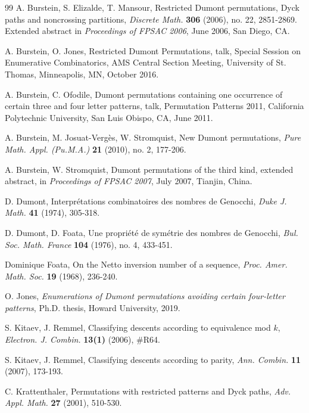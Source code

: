 \documentclass[
final
]{dmtcs-episciences}
\theoremstyle{definition}
\theoremstyle{remark}
\begin{document}
{\begin{thebibliography}{99}
 A. Burstein, S. Elizalde, T. Mansour, Restricted Dumont permutations, Dyck paths and noncrossing partitions, \emph{Discrete Math.} \textbf{306} (2006), no. 22, 2851-2869. Extended abstract in \emph{Proceedings of FPSAC 2006}, June 2006, San Diego, CA.

 A. Burstein, O. Jones, Restricted Dumont Permutations, talk, Special Session on Enumerative Combinatorics, AMS Central Section Meeting, University of St. Thomas, Minneapolis, MN, October 2016.

 A. Burstein, C. Ofodile, Dumont permutations containing one occurrence of certain three and four letter patterns, talk, Permutation Patterns 2011, California Polytechnic University, San Luis Obispo, CA, June 2011.

 A. Burstein, M. Josuat-Verg\`es, W. Stromquist, New Dumont permutations, \emph{Pure Math. Appl. (Pu.M.A.)} \textbf{21} (2010), no. 2, 177-206.

 A. Burstein, W. Stromquist, Dumont permutations of the third kind, extended abstract, in \emph{Proceedings of FPSAC 2007}, July 2007, Tianjin, China.

 D. Dumont, Interpr\'etations combinatoires des nombres de Genocchi, \emph{Duke J. Math.} \textbf {41} (1974), 305-318.

 D. Dumont, D. Foata, Une propri\'et\'e de sym\'etrie des nombres de Genocchi, \emph{Bul. Soc. Math. France} \textbf{104} (1976), no. 4, 433-451.

 Dominique Foata, On the Netto inversion number of a sequence, \emph{Proc. Amer. Math. Soc.} \textbf {19} (1968), 236-240.


 O. Jones, \emph{Enumerations of Dumont permutations avoiding certain four-letter patterns}, Ph.D. thesis, Howard University, 2019.

 S. Kitaev, J. Remmel, Classifying descents according to equivalence mod $k$, \emph{Electron. J. Combin.} \textbf{13(1)} (2006), \#R64.

 S. Kitaev, J. Remmel, Classifying descents according to parity, \emph{Ann. Combin.} \textbf{11} (2007), 173-193.

 C. Krattenthaler, Permutations with restricted patterns and Dyck paths, \emph{Adv. Appl. Math.} \textbf{27} (2001), 510-530.


\end{thebibliography}}
\end{document}
